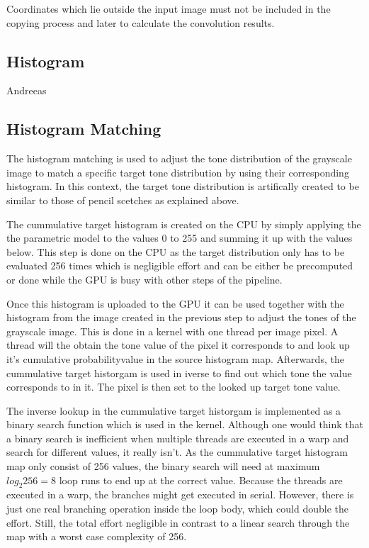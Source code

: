 Coordinates which lie outside the input image must not be included in the
copying process and later to calculate the convolution results.



\subsection{Histogram}
Andreeas

\subsection{Histogram Matching}
The histogram matching is used to adjust the tone distribution of the 
grayscale image to match a specific target tone distribution by using
their corresponding histogram. In this context, the target tone
distribution is artifically created to be similar to those of pencil
scetches as explained above.

The cummulative target histogram is created on the CPU by simply applying
the the parametric model to the values 0 to 255 and summing it up with
the values below.
This step is done on the CPU as the target distribution only has to
be evaluated 256 times which is negligible effort and can be either be
precomputed or done while the GPU is busy with other steps of the pipeline.

Once this histogram is uploaded to the GPU it can be used together with
the histogram from the image created in the previous step to adjust the
tones of the grayscale image. This is done in a kernel with one thread
per image pixel. A thread will the obtain the tone value of the pixel
it corresponds to and look up it's cumulative probabilityvalue in
the source histogram map.
Afterwards, the cummulative target historgam is used in iverse to find
out which tone the value corresponds to in it. The pixel is then set to
the looked up target tone value.

The inverse lookup in the cummulative target historgam is implemented
as a binary search function which is used in the kernel. Although
one would think that a binary search is inefficient when multiple threads
are executed in a warp and search for different values, it really isn't.
As the cummulative target histogram map only consist of 256 values,
the binary search will need at maximum $log_2 256=8$ loop runs to end
up at the correct value. Because the threads are executed in a warp,
the branches might get executed in serial. However, there is just one 
real branching operation inside the loop body, which could double the
effort. Still, the total effort negligible in contrast to a linear search
through the map with a worst case complexity of 256.

